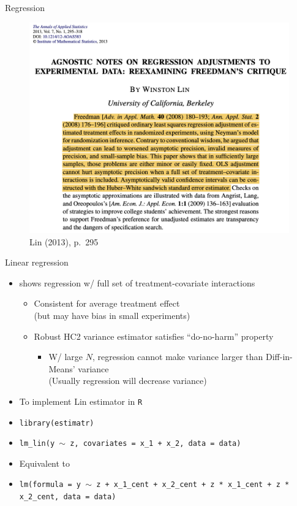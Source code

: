 \documentclass[table, xcolor = {dvipsnames}, 9pt]{beamer}
\theoremstyle{plain}
\begin{document}
\begin{frame}{Regression} \vfill
\begin{figure}[H]
\includegraphics[width=0.9\linewidth]{Lin_2013.png}
\caption{Lin (2013), p.~295}
\end{figure}
\end{frame}
\begin{frame}{Linear regression} \vfill
\begin{itemize} \vfill
\item \citet{lin2013} shows regression w/ full set of treatment-covariate interactions \vfill
\begin{itemize} \vfill
\item Consistent for average treatment effect \\ (but may have bias in small experiments) \vfill
\item Robust HC2 variance estimator satisfies ``do-no-harm'' property \vfill
\begin{itemize} \vfill
\item W/ large $N$, regression cannot make variance larger than Diff-in-Means' variance \\ (Usually regression will decrease variance) \vfill
\end{itemize} \vfill
\end{itemize} \vfill
\item To implement Lin estimator in \texttt{R} \vfill
\item[] \texttt{library(estimatr)}
\item[]\texttt{lm\_lin(y $\sim$ z, covariates = x\_1 + x\_2, data = data)} \vfill 
\item Equivalent to
\item[] \texttt{lm(formula = y $\sim$ z + x\_1\_cent + x\_2\_cent + z * x\_1\_cent + z * x\_2\_cent, data = data)}
\end{itemize}  
\end{frame}
\end{document}
